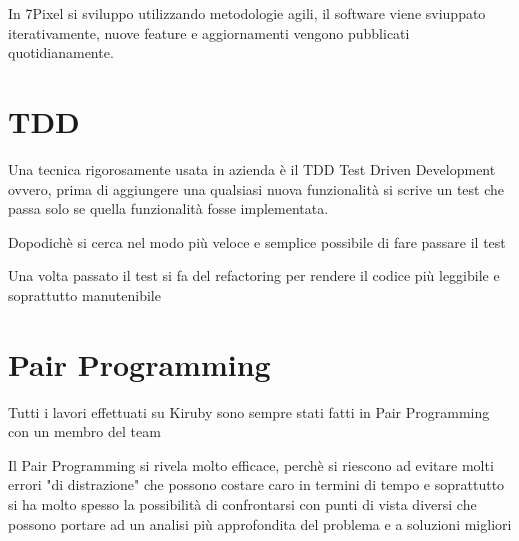 


In 7Pixel si sviluppo utilizzando metodologie agili, il software viene sviuppato
iterativamente, nuove feature e aggiornamenti vengono pubblicati quotidianamente.

\section{TDD}
Una tecnica rigorosamente usata in azienda è il TDD Test Driven Development ovvero, prima di
aggiungere una qualsiasi nuova funzionalità si scrive un test che passa solo se 
quella funzionalità fosse implementata. 

Dopodichè si cerca nel modo più veloce e semplice possibile di fare passare il test

Una volta passato il test si fa del refactoring per rendere il codice più leggibile
e soprattutto manutenibile

\section{Pair Programming}
Tutti i lavori effettuati su Kiruby sono sempre stati fatti in Pair Programming
con un membro del team

Il Pair Programming si rivela molto efficace, perchè si riescono ad evitare molti
errori "di distrazione" che possono costare caro in termini di tempo e soprattutto
si ha molto spesso la possibilità di confrontarsi con punti di vista diversi che possono
portare ad un analisi più approfondita del problema e a soluzioni migliori 

